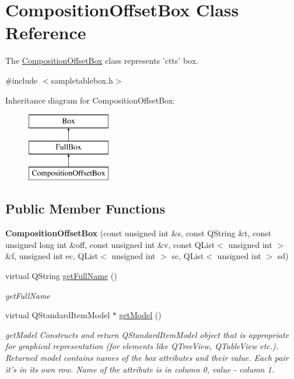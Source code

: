 \hypertarget{class_composition_offset_box}{\section{Composition\-Offset\-Box Class Reference}
\label{class_composition_offset_box}
}


The \hyperlink{class_composition_offset_box}{Composition\-Offset\-Box} class represents 'ctts' box.  




{\ttfamily \#include $<$sampletablebox.\-h$>$}

Inheritance diagram for Composition\-Offset\-Box\-:\begin{figure}[H]
\begin{center}
\leavevmode
\includegraphics[height=3.000000cm]{class_composition_offset_box}
\end{center}
\end{figure}
\subsection*{Public Member Functions}
\begin{DoxyCompactItemize}
\item 
\hypertarget{class_composition_offset_box_a5235a49ea1972fa0e0386ff33a819c85}{{\bfseries Composition\-Offset\-Box} (const unsigned int \&s, const Q\-String \&t, const unsigned long int \&off, const unsigned int \&v, const Q\-List$<$ unsigned int $>$ \&f, unsigned int ec, Q\-List$<$ unsigned int $>$ sc, Q\-List$<$ unsigned int $>$ sd)}\label{class_composition_offset_box_a5235a49ea1972fa0e0386ff33a819c85}

\item 
virtual Q\-String \hyperlink{class_composition_offset_box_a6ed0d84212f70f61a021b39e1114c0fb}{get\-Full\-Name} ()
\begin{DoxyCompactList}\small\item\em get\-Full\-Name \end{DoxyCompactList}\item 
virtual Q\-Standard\-Item\-Model $\ast$ \hyperlink{class_composition_offset_box_aeeeab60183eae5c832e9e46a055ba4e3}{get\-Model} ()
\begin{DoxyCompactList}\small\item\em get\-Model Constructs and return Q\-Standard\-Item\-Model object that is appropriate for graphical representation (for elements like Q\-Tree\-View, Q\-Table\-View etc.). Returned model contains names of the box attributes and their value. Each pair it's in its own row. Name of the attribute is in column 0, value -\/ column 1. \end{DoxyCompactList}\end{DoxyCompactItemize}
